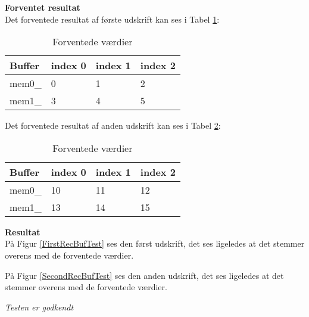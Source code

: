 \textbf{Forventet resultat} \\
Det forventede resultat af første udskrift kan ses i Tabel \ref{IL:modultest:values1}:

\begin{table}[H]
	\caption{Forventede værdier }
\begin{center}
    \begin{tabular}{ | l | l | l | l |}
    \hline 
    \textbf{Buffer} 	& \textbf{index 0}  &\textbf{index 1}	&\textbf{index 2}  	\\ \hline
     mem0\_	 	& 0   				& 1				& 2			\\ \hline
     mem1\_ 	& 3  				& 4 			& 5				\\ \hline
    \end{tabular}
\end{center}
	\label{IL:modultest:values1}
\end{table}

Det forventede resultat af anden udskrift kan ses i Tabel \ref{IL:modultest:values2}:

\begin{table}[H]
	\caption{Forventede værdier }
\begin{center}
    \begin{tabular}{ | l | l | l | l |}
    \hline 
    \textbf{Buffer} 	& \textbf{index 0}  &\textbf{index 1}	&\textbf{index 2}  	\\ \hline
     mem0\_	 	& 10   				& 11				& 12			\\ \hline
     mem1\_ 	& 13  				& 14 			& 15				\\ \hline
    \end{tabular}
\end{center}
	\label{IL:modultest:values2}
\end{table}

\textbf{Resultat} \\


På Figur \ref{FirstRecBufTest} ses den først udskrift, det ses ligeledes at det stemmer overens med de forventede værdier.


På Figur \ref{SecondRecBufTest} ses den anden udskrift, det ses ligeledes at det stemmer overens med de forventede værdier.  



\textit{Testen er godkendt}




